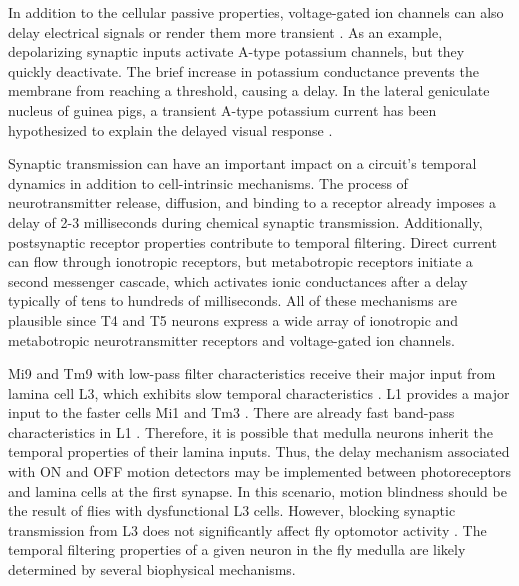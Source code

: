 In addition to the cellular passive properties, voltage-gated ion channels can also delay electrical signals or render them more transient \parencite{Destexhe1999}. As an example, depolarizing synaptic inputs activate A-type potassium channels, but they quickly deactivate. The brief increase in potassium conductance prevents the membrane from reaching a threshold, causing a delay. In the lateral geniculate nucleus of guinea pigs, a transient A-type potassium current has been hypothesized to explain the delayed visual response \parencite{Mccormick1991}.

Synaptic transmission can have an important impact on a circuit's temporal dynamics in addition to cell-intrinsic mechanisms. The process of neurotransmitter release, diffusion, and binding to a receptor already imposes a delay of 2-3 milliseconds during chemical synaptic transmission. Additionally, postsynaptic receptor properties contribute to temporal filtering. Direct current can flow through ionotropic receptors, but metabotropic receptors initiate a second messenger cascade, which activates ionic conductances after a delay typically of tens to hundreds of milliseconds. All of these mechanisms are plausible since T4 and T5 neurons express a wide array of ionotropic and metabotropic neurotransmitter receptors and voltage-gated ion channels. 

Mi9 and Tm9 with low-pass filter characteristics receive their major input from lamina cell L3, which exhibits slow temporal characteristics \parencite{Silies2013}. L1 provides a major input to the faster cells Mi1 and Tm3 \parencite{Takemura2017}. There are already fast band-pass characteristics in L1 \parencite{Clark2011, Reiff2010, Drews2020}. Therefore, it is possible that medulla neurons inherit the temporal properties of their lamina inputs. Thus, the delay mechanism associated with ON and OFF motion detectors may be implemented between photoreceptors and lamina cells at the first synapse. In this scenario, motion blindness should be the result of flies with dysfunctional L3 cells. However, blocking synaptic transmission from L3 does not significantly affect fly optomotor activity \parencite{Bahl2015, Silies2013, Tuthill2013}. The temporal filtering properties of a given neuron in the fly medulla are likely determined by several biophysical mechanisms.

